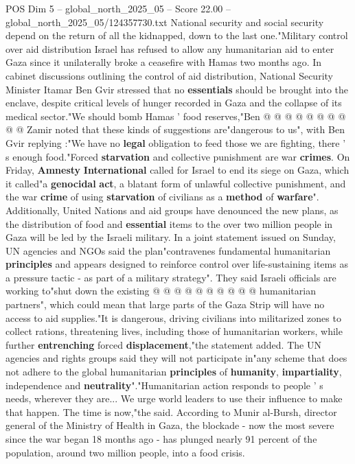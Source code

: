 \begin{textsample}{POS Dim 5 – global\_north\_2025\_05 – Score 22.00 – global\_north\_2025\_05/124357730.txt}
National security and social security depend on the return of all the kidnapped, down to the last one."Military control over aid distribution Israel has refused to allow any humanitarian aid to enter Gaza since it unilaterally broke a ceasefire with Hamas two months ago.
In cabinet discussions outlining the control of aid distribution, National Security Minister Itamar Ben Gvir stressed that no \textbf{essentials} should be brought into the enclave, despite critical levels of hunger recorded in Gaza and the collapse of its medical sector."We should bomb Hamas ' food reserves,"Ben @ @ @ @ @ @ @ @ @ @ Zamir noted that these kinds of suggestions are"dangerous to us", with Ben Gvir replying :"We have no \textbf{legal} obligation to feed those we are fighting, there ' s enough food."Forced \textbf{starvation} and collective punishment are war \textbf{crimes}.
On Friday, \textbf{Amnesty} \textbf{International} called for Israel to end its siege on Gaza, which it called"a \textbf{genocidal} \textbf{act}, a blatant form of unlawful collective punishment, and the war \textbf{crime} of using \textbf{starvation} of civilians as a \textbf{method} of \textbf{warfare}".
Additionally, United Nations and aid groups have denounced the new plans, as the distribution of food and \textbf{essential} items to the over two million people in Gaza will be led by the Israeli military.
In a joint statement issued on Sunday, UN agencies and NGOs said the plan"contravenes fundamental humanitarian \textbf{principles} and appears designed to reinforce control over life-sustaining items as a pressure tactic - as part of a military strategy".
They said Israeli officials are working to"shut down the existing @ @ @ @ @ @ @ @ @ @ humanitarian partners", which could mean that large parts of the Gaza Strip will have no access to aid supplies."It is dangerous, driving civilians into militarized zones to collect rations, threatening lives, including those of humanitarian workers, while further \textbf{entrenching} forced \textbf{displacement},"the statement added.
The UN agencies and rights groups said they will not participate in"any scheme that does not adhere to the global humanitarian \textbf{principles} of \textbf{humanity}, \textbf{impartiality}, independence and \textbf{neutrality}"."Humanitarian action responds to people ' s needs, wherever they are...
We urge world leaders to use their influence to make that happen.
The time is now,"the said.
According to Munir al-Bursh, director general of the Ministry of Health in Gaza, the blockade - now the most severe since the war began 18 months ago - has plunged nearly 91 percent of the population, around two million people, into a food crisis.

\end{textsample}
